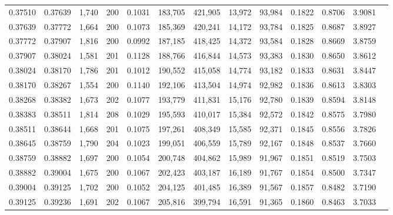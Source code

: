 \begin{tabular}{rrrrrrrrrrrrr}
0.37510 & 0.37639 & 1,740 & 200 &                                     0.1031 & 183,705 & 421,905 &  13,972 &  93,984 & 0.1822 & 0.8706 & 3.9081 \\
0.37639 & 0.37772 & 1,664 & 200 &                                     0.1073 & 185,369 & 420,241 &  14,172 &  93,784 & 0.1825 & 0.8687 & 3.8927 \\
0.37772 & 0.37907 & 1,816 & 200 &                                     0.0992 & 187,185 & 418,425 &  14,372 &  93,584 & 0.1828 & 0.8669 & 3.8759 \\
0.37907 & 0.38024 & 1,581 & 201 &                                     0.1128 & 188,766 & 416,844 &  14,573 &  93,383 & 0.1830 & 0.8650 & 3.8612 \\
0.38024 & 0.38170 & 1,786 & 201 &                                     0.1012 & 190,552 & 415,058 &  14,774 &  93,182 & 0.1833 & 0.8631 & 3.8447 \\
0.38170 & 0.38267 & 1,554 & 200 &                                     0.1140 & 192,106 & 413,504 &  14,974 &  92,982 & 0.1836 & 0.8613 & 3.8303 \\
0.38268 & 0.38382 & 1,673 & 202 &                                     0.1077 & 193,779 & 411,831 &  15,176 &  92,780 & 0.1839 & 0.8594 & 3.8148 \\
0.38383 & 0.38511 & 1,814 & 208 &                                     0.1029 & 195,593 & 410,017 &  15,384 &  92,572 & 0.1842 & 0.8575 & 3.7980 \\
0.38511 & 0.38644 & 1,668 & 201 &                                     0.1075 & 197,261 & 408,349 &  15,585 &  92,371 & 0.1845 & 0.8556 & 3.7826 \\
0.38645 & 0.38759 & 1,790 & 204 &                                     0.1023 & 199,051 & 406,559 &  15,789 &  92,167 & 0.1848 & 0.8537 & 3.7660 \\
0.38759 & 0.38882 & 1,697 & 200 &                                     0.1054 & 200,748 & 404,862 &  15,989 &  91,967 & 0.1851 & 0.8519 & 3.7503 \\
0.38882 & 0.39004 & 1,675 & 200 &                                     0.1067 & 202,423 & 403,187 &  16,189 &  91,767 & 0.1854 & 0.8500 & 3.7347 \\
0.39004 & 0.39125 & 1,702 & 200 &                                     0.1052 & 204,125 & 401,485 &  16,389 &  91,567 & 0.1857 & 0.8482 & 3.7190 \\
0.39125 & 0.39236 & 1,691 & 202 &                                     0.1067 & 205,816 & 399,794 &  16,591 &  91,365 & 0.1860 & 0.8463 & 3.7033 \\

\end{tabular}

